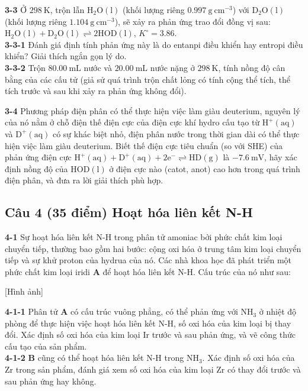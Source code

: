 \vspace{0.2cm}

\noindent
\textbf{3-3} Ở $298\ \mathrm{K}$, trộn lẫn $\mathrm{H_2O(l)}$ (khối lượng riêng $0.997\ \mathrm{g\ cm^{-3}}$) với $\mathrm{D_2O(l)}$ (khối lượng riêng $1.104\ \mathrm{g\ cm^{-3}}$), sẽ xảy ra phản ứng trao đổi đồng vị sau: $\mathrm{H_2O(l) + D_2O(l) \rightleftharpoons 2HOD(l)}$, $K^\circ = 3.86$. \\
\textbf{3-3-1} Đánh giá định tính phản ứng này là do entanpi điều khiển hay entropi điều khiển? Giải thích ngắn gọn lý do. \\
\textbf{3-3-2} Trộn $80.00\ \mathrm{mL}$ nước và $20.00\ \mathrm{mL}$ nước nặng ở $298\ \mathrm{K}$, tính nồng độ cân bằng của các cấu tử (giả sử quá trình trộn chất lỏng có tính cộng thể tích, thể tích trước và sau khi xảy ra phản ứng không đổi).

\vspace{0.2cm}

\noindent
\textbf{3-4} Phương pháp điện phân có thể thực hiện việc làm giàu deuterium, nguyên lý của nó nằm ở chỗ điện thế điện cực của điện cực khí hydro cấu tạo từ $\mathrm{H^+(aq)}$ và $\mathrm{D^+(aq)}$ có sự khác biệt nhỏ, điện phân nước trong thời gian dài có thể thực hiện việc làm giàu deuterium. Biết thế điện cực tiêu chuẩn (so với SHE) của phản ứng điện cực $\mathrm{H^+(aq) + D^+(aq) + 2e^- \rightleftharpoons HD(g)}$ là $-7.6\ \mathrm{mV}$, hãy xác định nồng độ của $\mathrm{HOD(l)}$ ở điện cực nào (catot, anot) cao hơn trong quá trình điện phân, và đưa ra lời giải thích phù hợp.

\vspace{0.5cm}

\subsection{Câu 4 (35 điểm) Hoạt hóa liên kết N-H}

\noindent
\textbf{4-1} Sự hoạt hóa liên kết N-H trong phân tử amoniac bởi phức chất kim loại chuyển tiếp, thường bao gồm hai bước: cộng oxi hóa ở trung tâm kim loại chuyển tiếp và sự khử proton của hydrua của nó. Các nhà khoa học đã phát triển một phức chất kim loại iridi $\mathbf{A}$ để hoạt hóa liên kết N-H. Cấu trúc của nó như sau:

\begin{center}
    [Hình ảnh]
\end{center}

\noindent
\textbf{4-1-1} Phân tử $\mathbf{A}$ có cấu trúc vuông phẳng, có thể phản ứng với $\mathrm{NH_3}$ ở nhiệt độ phòng để thực hiện việc hoạt hóa liên kết N-H, số oxi hóa của kim loại bị thay đổi. Xác định số oxi hóa của kim loại $\mathrm{Ir}$ trước và sau phản ứng, và vẽ công thức cấu tạo của sản phẩm. \\
\textbf{4-1-2} $\mathbf{B}$ cũng có thể hoạt hóa liên kết N-H trong $\mathrm{NH_3}$. Xác định số oxi hóa của $\mathrm{Zr}$ trong sản phẩm, đánh giá xem số oxi hóa của kim loại $\mathrm{Zr}$ có thay đổi trước và sau phản ứng hay không.

